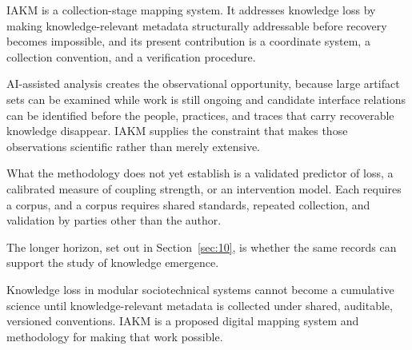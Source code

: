 \documentclass[conference]{IEEEtran}
\begin{document}
IAKM is a collection-stage mapping system. It addresses knowledge loss by making knowledge-relevant metadata structurally addressable before recovery becomes impossible, and its present contribution is a coordinate system, a collection convention, and a verification procedure.

AI-assisted analysis creates the observational opportunity, because large artifact sets can be examined while work is still ongoing and candidate interface relations can be identified before the people, practices, and traces that carry recoverable knowledge disappear. IAKM supplies the constraint that makes those observations scientific rather than merely extensive.

What the methodology does not yet establish is a validated predictor of loss, a calibrated measure of coupling strength, or an intervention model. Each requires a corpus, and a corpus requires shared standards, repeated collection, and validation by parties other than the author.

The longer horizon, set out in Section~\ref{sec:10}, is whether the same records can support the study of knowledge emergence.

Knowledge loss in modular sociotechnical systems cannot become a cumulative science until knowledge-relevant metadata is collected under shared, auditable, versioned conventions. IAKM is a proposed digital mapping system and methodology for making that work possible.
\end{document}
